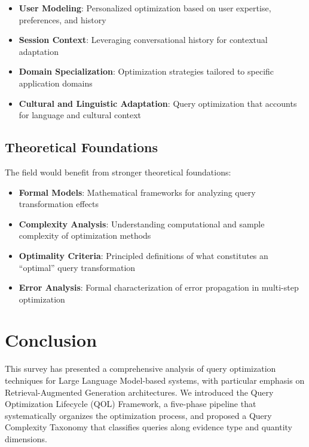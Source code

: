 \documentclass{article}
\begin{document}
\begin{itemize}[leftmargin=*,nosep]
    \item \textbf{User Modeling}: Personalized optimization based on user expertise, preferences, and history
    \item \textbf{Session Context}: Leveraging conversational history for contextual adaptation
    \item \textbf{Domain Specialization}: Optimization strategies tailored to specific application domains
    \item \textbf{Cultural and Linguistic Adaptation}: Query optimization that accounts for language and cultural context
\end{itemize}

\subsection{Theoretical Foundations}

The field would benefit from stronger theoretical foundations:

\begin{itemize}[leftmargin=*,nosep]
    \item \textbf{Formal Models}: Mathematical frameworks for analyzing query transformation effects
    \item \textbf{Complexity Analysis}: Understanding computational and sample complexity of optimization methods
    \item \textbf{Optimality Criteria}: Principled definitions of what constitutes an ``optimal'' query transformation
    \item \textbf{Error Analysis}: Formal characterization of error propagation in multi-step optimization
\end{itemize}

\section{Conclusion}\label{sec:conclusion}

This survey has presented a comprehensive analysis of query optimization techniques for Large Language Model-based systems, with particular emphasis on Retrieval-Augmented Generation architectures. We introduced the Query Optimization Lifecycle (QOL) Framework, a five-phase pipeline that systematically organizes the optimization process, and proposed a Query Complexity Taxonomy that classifies queries along evidence type and quantity dimensions.
\end{document}
